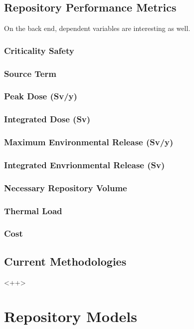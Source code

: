 \subsection{Repository Performance Metrics}
On the back end, dependent variables are interesting as well. 
\subsubsection{Criticality Safety}
\subsubsection{Source Term}
\subsubsection{Peak Dose (Sv/y)}
\subsubsection{Integrated Dose (Sv)}
\subsubsection{Maximum Environmental Release (Sv/y)}
\subsubsection{Integrated Envrionmental Release (Sv)}
\subsubsection{Necessary Repository Volume}
\subsubsection{Thermal Load}
\subsubsection{Cost}
\subsection{Current Methodologies}<++>

\section{Repository Models}
